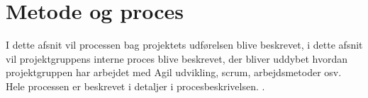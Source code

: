 \chapter{Metode og proces}
\label{cha:method-and-process}

I dette afsnit vil processen bag projektets udførelsen blive beskrevet, i dette afsnit vil projektgruppens interne proces blive beskrevet, der bliver uddybet hvordan projektgruppen har arbejdet med Agil udvikling, scrum, arbejdsmetoder osv. Hele processen er beskrevet i detaljer i procesbeskrivelsen. .

